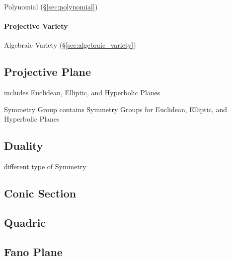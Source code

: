 Polynomial (\S\ref{sec:polynomial})



\paragraph{Projective Variety}\label{sec:projective_variety}\hfill

Algebraic Variety (\S\ref{sec:algebraic_variety})



\subsection{Projective Plane}\label{sec:projective_plane}

includes Euclidean, Elliptic, and Hyperbolic Planes

Symmetry Group contains Symmetry Groups for Euclidean, Elliptic, and
Hyperbolic Planes



\subsection{Duality}\label{sec:projective_duality}

different type of Symmetry %



\subsection{Conic Section}\label{sec:conic_section}

\subsection{Quadric}\label{sec:quadric}

\subsection{Fano Plane}\label{sec:fano_plane}

